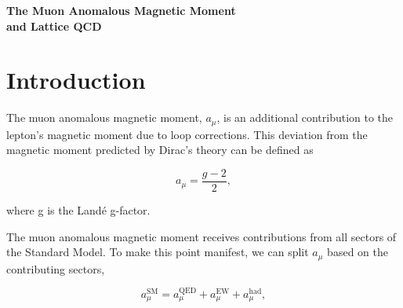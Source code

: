 \documentclass{article}
\numberwithin{equation}{section} %
\begin{document}
\begin{titlepage}
\begin{center}
\vspace*{1cm}
\vspace{0.5cm}

{\LARGE \textbf{The Muon Anomalous Magnetic Moment \\and Lattice QCD}}
\vspace{3cm}

\vspace{1cm}
\vspace{7cm}


\end{center}
\end{titlepage}

\newcommand{\amu}{$a_\mu$ }

\tableofcontents

\newpage

\section{Introduction}\label{intro}

The muon anomalous magnetic moment, $a_\mu$, is an additional contribution to the lepton's magnetic moment due to loop corrections. This deviation from the magnetic moment predicted by Dirac's theory can be defined as\cite{lehnerg2}

\begin{equation}
a_\mu = \frac{g-2}{2},
\label{amu}
\end{equation}

\noindent where g is the Land\'e g-factor.  

The muon anomalous magnetic moment receives contributions from all sectors of the Standard Model. To make this point manifest, we can split $a_\mu$ based on the contributing sectors\cite{hoecker},

\begin{equation}
a^{\mathrm{SM}}_\mu= a_\mu^{\mathrm{QED}} + a_\mu^{\mathrm{EW}} + a_\mu^{\mathrm{had}},
\label{asm}
\end{equation}
\end{document}
